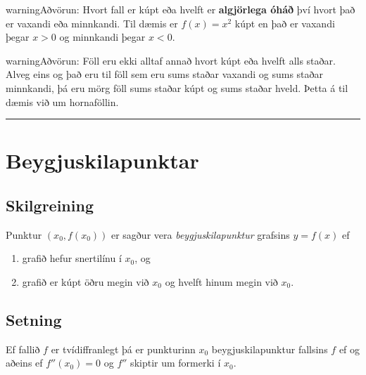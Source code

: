 \documentclass[a4paper,10pt,icelandic]{sphinxmanual}
\begin{document}
\begin{notice}{warning}{Aðvörun:}
Hvort fall er kúpt eða hvelft er \textbf{algjörlega óháð} því hvort það er
vaxandi eða minnkandi. Til dæmis er \(f(x) = x^2\) kúpt en það er
vaxandi þegar \(x>0\) og minnkandi þegar \(x<0\).
\end{notice}

\begin{notice}{warning}{Aðvörun:}
Föll eru ekki alltaf annað hvort kúpt eða hvelft alls staðar. Alveg
eins og það eru til föll sem eru sums staðar vaxandi og sums staðar
minnkandi, þá eru mörg föll sums staðar kúpt og sums staðar hveld.
Þetta á til dæmis við um hornaföllin.
\end{notice}


\bigskip\hrule{}\bigskip



\section{Beygjuskilapunktar}
\label{kafli05:beygjuskilapunktar}

\subsection{Skilgreining}
\label{kafli05:index-2}\label{kafli05:skilgreining}
Punktur \((x_0, f(x_0))\) er sagður vera \textit{beygjuskilapunktur}
grafsins \(y=f(x)\) ef
\begin{enumerate}
\item {} 
grafið hefur snertilínu í \(x_0\), og

\item {} 
grafið er kúpt öðru megin við \(x_0\) og hvelft hinum megin við
\(x_0\).

\end{enumerate}


\subsection{Setning}
\label{kafli05:id4}
Ef fallið \(f\) er tvídiffranlegt þá er punkturinn \(x_0\)
beygjuskilapunktur fallsins \(f\) ef og aðeins ef
\(f''(x_0) =0\) og \(f''\) skiptir um formerki í \(x_0\).


\end{document}
